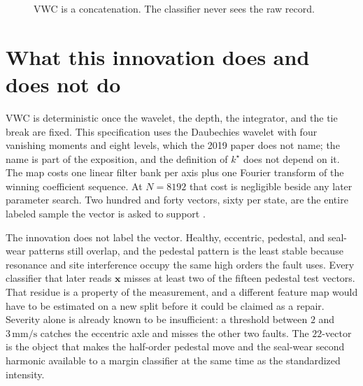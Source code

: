 \documentclass[11pt,a4paper]{article}
\newcommand{\vect}[1]{\mathbf{#1}}
\begin{document}
\begin{figure}[ht]
\centering
{}
\caption{VWC is a concatenation. The classifier never sees the raw record.}
\label{fig:flow}
\end{figure}

\section{What this innovation does and does not do}

VWC is deterministic once the wavelet, the depth, the integrator, and the tie break are fixed.
This specification uses the Daubechies wavelet with four vanishing moments and eight levels, which the 2019 paper does not name; the name is part of the exposition, and the definition of $k^{\star}$ does not depend on it.
The map costs one linear filter bank per axis plus one Fourier transform of the winning coefficient sequence.
At $N=8192$ that cost is negligible beside any later parameter search.
Two hundred and forty vectors, sixty per state, are the entire labeled sample the vector is asked to support \cite{you2019}.

The innovation does not label the vector.
Healthy, eccentric, pedestal, and seal-wear patterns still overlap, and the pedestal pattern is the least stable because resonance and site interference occupy the same high orders the fault uses.
Every classifier that later reads $\vect{x}$ misses at least two of the fifteen pedestal test vectors.
That residue is a property of the measurement, and a different feature map would have to be estimated on a new split before it could be claimed as a repair.
Severity alone is already known to be insufficient: a threshold between $2$ and $3\,\mathrm{mm/s}$ catches the eccentric axle and misses the other two faults.
The $22$-vector is the object that makes the half-order pedestal move and the seal-wear second harmonic available to a margin classifier at the same time as the standardized intensity.
\end{document}
